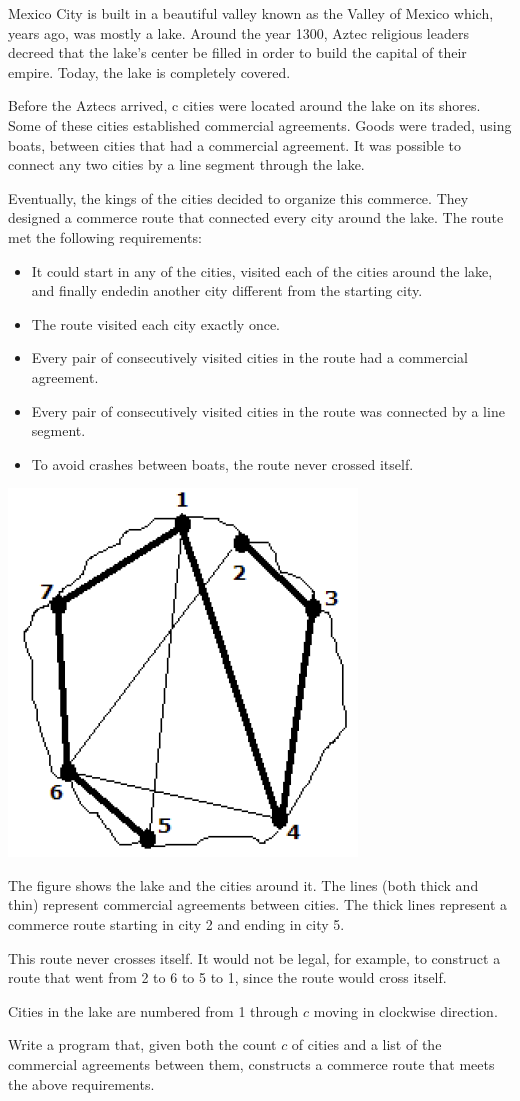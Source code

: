 Mexico City is built in a beautiful valley known as the Valley of Mexico which, years ago, was mostly a lake. Around the year 1300, Aztec religious leaders decreed that the lake's center be filled in order to build the capital of their empire. Today, the lake is completely covered.

Before the Aztecs arrived, c cities were located around the lake on its shores. Some of these cities established commercial agreements. Goods were traded, using boats, between cities that had a commercial agreement. It was possible to connect any two cities by a line segment through the lake.

Eventually, the kings of the cities decided to organize this commerce. They designed a commerce route that connected every city around the lake. The route met the following requirements:
\begin{itemize}
\item It could start in any of the cities, visited each of the cities around the lake, and finally endedin another city different from the starting city.
\item The route visited each city exactly once.
\item Every pair of consecutively visited cities in the route had a commercial agreement.
\item Every pair of consecutively visited cities in the route was connected by a line segment.
\item To avoid crashes between boats, the route never crossed itself.
\end{itemize}

\includegraphics{mexico.png}

The figure shows the lake and the cities around it. The lines (both thick and thin) represent commercial agreements between cities. The thick lines represent a
commerce route starting in city 2 and ending in city 5.

This route never crosses itself. It would not be legal, for example, to construct a route that went from 2 to 6 to 5 to 1, since the route would cross itself.

Cities in the lake are numbered from 1 through $c$ moving in clockwise direction.

Write a program that, given both the count $c$ of cities and a list of the commercial agreements between them, constructs a commerce route that meets the above requirements.